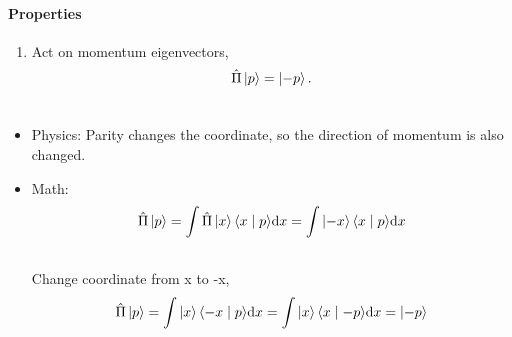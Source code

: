 \documentclass[letterpaper,10pt,english]{sphinxmanual}
\def\d{{\rm d}}
\newcommand{\ket}[1]{\left| #1\right\rangle}
\newcommand{\braket}[2]{\langle #1 \mid #2 \rangle}
\begin{document}
\paragraph{Properties}
\label{QuantumMechanics:properties}\begin{enumerate}
\item {} 
Act on momentum eigenvectors,
\begin{gather}
\begin{split}\hat \Pi \ket{p} = \ket{-p} .\end{split}\notag\\\begin{split}\end{split}\notag
\end{gather}
\end{enumerate}
\begin{itemize}
\item {} 
Physics: Parity changes the coordinate, so the direction of momentum is also changed.

\item {} 
Math:
\begin{gather}
\begin{split}\hat \Pi \ket{p} = \int \hat \Pi \ket{x}\braket{x}{p}\d x= \int \ket{-x}\braket{x}{p}\d x\end{split}\notag\\\begin{split}\end{split}\notag
\end{gather}
Change coordinate from x to -x,
\begin{gather}
\begin{split}\hat \Pi \ket{p} = \int \ket{x}\braket{-x}{p}\d x = \int \ket{x}\braket{x}{-p}\d x  = \ket{-p}\end{split}\notag\\\begin{split}\end{split}\notag
\end{gather}
\end{itemize}
\end{document}

